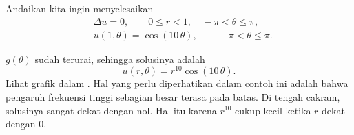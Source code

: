 \begin{example}
Andaikan kita ingin menyelesaikan
\begin{align*}
& \Delta u = 0 , \qquad 0 \leq r < 1, \quad -\pi < \theta \leq \pi,\\
& u(1,\theta) = \cos(10\,\theta), \qquad -\pi < \theta \leq \pi.
\end{align*}

$g(\theta)$ sudah terurai, sehingga
solusinya adalah
\begin{equation*}
u(r,\theta) = r^{10} \cos(10\,\theta) .
\end{equation*}
Lihat grafik dalam .
Hal yang perlu diperhatikan dalam contoh ini adalah bahwa pengaruh frekuensi tinggi
sebagian besar terasa pada batas.  Di tengah cakram, solusinya
sangat dekat dengan nol.  Hal itu karena $r^{10}$ cukup kecil ketika $r$
dekat dengan 0.
\begin{myfig}
\capstart
{}
\caption{Solusi masalah Dirichlet dalam cakram dengan
$\cos(10\,\theta)$ sebagai data batas.\label{dirichdisc:tenspeedfig}}
\end{myfig}
\end{example}

